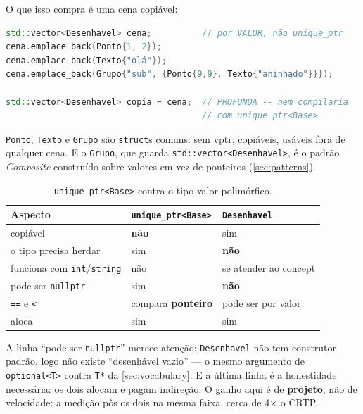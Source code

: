 O que isso compra é uma cena copiável:

\begin{lstlisting}[style=bt, language=C++,
    caption={Uma cena por valor, com cópia profunda.}]
std::vector<Desenhavel> cena;          // por VALOR, não unique_ptr
cena.emplace_back(Ponto{1, 2});
cena.emplace_back(Texto{"olá"});
cena.emplace_back(Grupo{"sub", {Ponto{9,9}, Texto{"aninhado"}}});

std::vector<Desenhavel> copia = cena;  // PROFUNDA -- nem compilaria
                                       // com unique_ptr<Base>
\end{lstlisting}

\texttt{Ponto}, \texttt{Texto} e \texttt{Grupo} são \texttt{struct}s comuns: sem
vptr, copiáveis, usáveis fora de qualquer cena. E o \texttt{Grupo}, que guarda
\texttt{std::vector<Desenhavel>}, é o padrão \emph{Composite} construído sobre
valores em vez de ponteiros (\cref{sec:patterns}).

\begin{table}[htbp]
\centering
\caption{\texttt{unique\_ptr<Base>} contra o tipo-valor polimórfico.}
\label{tab:valor-vs-ptr}
\footnotesize
\begin{tabular}{@{}lll@{}}
\toprule
\textbf{Aspecto} & \texttt{unique\_ptr<Base>} & \texttt{Desenhavel} \\
\midrule
copiável                      & \textbf{não} & sim \\
o tipo precisa herdar         & sim & \textbf{não} \\
funciona com \texttt{int}/\texttt{string} & não & se atender ao \gls{concept} \\
pode ser \texttt{nullptr}     & sim & \textbf{não} \\
\texttt{==} e \texttt{<}      & compara \textbf{ponteiro} & pode ser por valor \\
aloca                         & sim & sim \\
\bottomrule
\end{tabular}
\end{table}

A linha ``pode ser \texttt{nullptr}'' merece atenção: \texttt{Desenhavel} não tem
construtor padrão, logo não existe ``desenhável vazio'' --- o mesmo argumento de
\texttt{optional<T>} contra \texttt{T*} da \cref{sec:vocabulary}. E a última
linha é a honestidade necessária: os dois alocam e pagam indireção. O ganho aqui
é de \textbf{projeto}, não de velocidade: a medição pôs os dois na mesma faixa,
cerca de 4× o CRTP.

